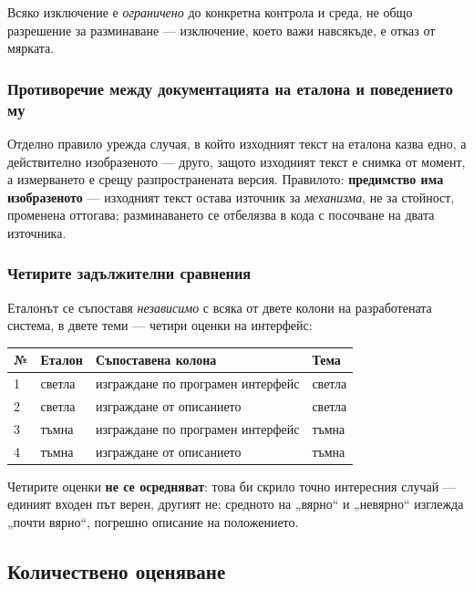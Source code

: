 Всяко изключение е \emph{ограничено} до конкретна контрола и среда, не общо разрешение
за разминаване --- изключение, което важи навсякъде, е отказ от мярката.

\subsubsection{Противоречие между документацията на еталона и поведението му}

Отделно правило урежда случая, в който изходният текст на еталона казва едно, а
действително изобразеното --- друго, защото изходният текст е снимка от момент, а
измерването е срещу разпространената версия. Правилото: \textbf{предимство има
изобразеното} --- изходният текст остава източник за \emph{механизма}, не за
стойност, променена оттогава; разминаването се отбелязва в кода с посочване на двата
източника.

\subsubsection{Четирите задължителни сравнения}

Еталонът се съпоставя \emph{независимо} с всяка от двете колони на разработената
система, в двете теми --- четири оценки на интерфейс:

\begin{center}
\begin{tabular}{@{}llll@{}}
\textbf{№} & \textbf{Еталон} & \textbf{Съпоставена колона} & \textbf{Тема} \\
\hline
1 & светла & изграждане по програмен интерфейс & светла \\
2 & светла & изграждане от описанието & светла \\
3 & тъмна  & изграждане по програмен интерфейс & тъмна \\
4 & тъмна  & изграждане от описанието & тъмна \\
\end{tabular}
\end{center}

Четирите оценки \textbf{не се осредняват}: това би скрило точно интересния случай ---
единият входен път верен, другият не; средното на „вярно“ и „невярно“ изглежда „почти
вярно“, погрешно описание на положението.

\subsection{Количествено оценяване}
\label{subsec:scoring}

